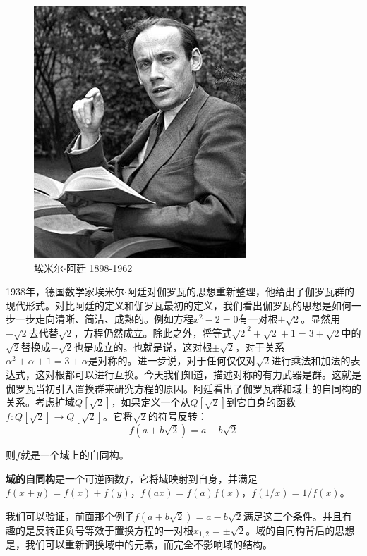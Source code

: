 \documentclass[b5paper]{ctexart}
\begin{document}
\begin{figure}[htbp]
 \centering
 \includegraphics[scale=0.4]{img/emil-artin}
 \captionsetup{labelformat=empty}
 \caption{埃米尔$\cdot$阿廷 1898-1962}
 \label{fig:Emil-Artin}
\end{figure}

1938年，德国数学家埃米尔$\cdot$阿廷对伽罗瓦的思想重新整理，他给出了伽罗瓦群的现代形式。对比阿廷的定义和伽罗瓦最初的定义，我们看出伽罗瓦的思想是如何一步一步走向清晰、简洁、成熟的。例如方程$x^2 - 2 = 0$有一对根$\pm \sqrt{2}$。显然用$-\sqrt{2}$去代替$\sqrt{2}$，方程仍然成立。除此之外，将等式$\sqrt{2}^2 + \sqrt{2} + 1 = 3 + \sqrt{2}$中的$\sqrt{2}$替换成$-\sqrt{2}$也是成立的。也就是说，这对根$\pm \sqrt{2}$，对于关系$\alpha^2 + \alpha + 1 = 3 + \alpha$是对称的。进一步说，对于任何仅仅对$\sqrt{2}$进行乘法和加法的表达式，这对根都可以进行互换。今天我们知道，描述对称的有力武器是群。这就是伽罗瓦当初引入置换群来研究方程的原因。阿廷看出了伽罗瓦群和域上的自同构的关系。考虑扩域$Q[\sqrt{2}]$，如果定义一个从$Q[\sqrt{2}]$到它自身的函数$f: Q[\sqrt{2}] \to Q[\sqrt{2}]$。它将$\sqrt{2}$的符号反转：
\[
f(a + b \sqrt{2}) = a - b \sqrt{2}
\]

则$f$就是一个域上的自同构。

\begin{definition}
\textbf{域的自同构}是一个可逆函数$f$，它将域映射到自身，并满足$f(x + y) = f(x) + f(y)$，$f(ax) = f(a) f(x)$，$f(1/x) = 1/f(x)$。
\end{definition}

我们可以验证，前面那个例子$f(a + b \sqrt{2}) = a - b \sqrt{2}$满足这三个条件。并且有趣的是反转正负号等效于置换方程的一对根$x_{1,2} = \pm \sqrt{2}$。域的自同构背后的思想是，我们可以重新调换域中的元素，而完全不影响域的结构。
\end{document}
